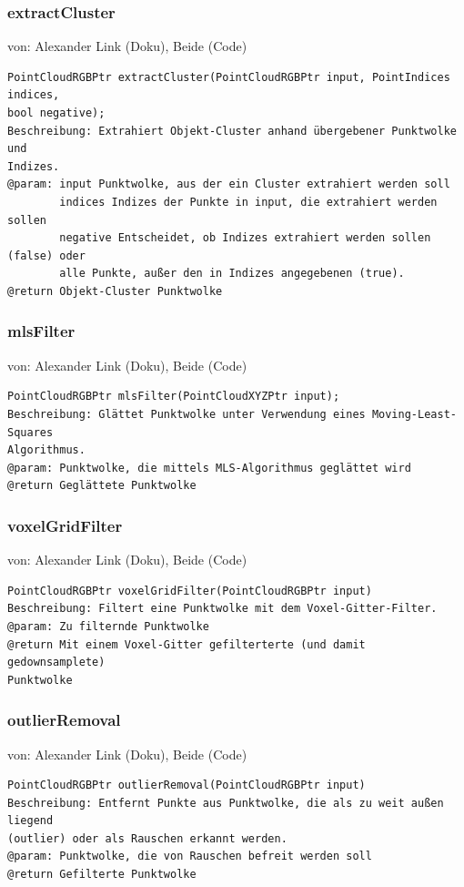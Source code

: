 \documentclass{suturo}
\makeatletter
\newcommand{\chapterauthor}[1]{%
  {\parindent0pt\vspace*{-27pt}%
  \linespread{0}\small\begin{flushright}von: #1\end{flushright}%
  \par\nobreak\vspace*{0pt}}
  \@afterheading%
}
\makeatother
\begin{document}
\subsubsection{extractCluster}
\chapterauthor{Alexander Link (Doku), Beide (Code)}
\begin{verbatim}
PointCloudRGBPtr extractCluster(PointCloudRGBPtr input, PointIndices indices, 
bool negative);
Beschreibung: Extrahiert Objekt-Cluster anhand übergebener Punktwolke und
Indizes.
@param: input Punktwolke, aus der ein Cluster extrahiert werden soll
		indices Indizes der Punkte in input, die extrahiert werden sollen
		negative Entscheidet, ob Indizes extrahiert werden sollen (false) oder
		alle Punkte, außer den in Indizes angegebenen (true).
@return Objekt-Cluster Punktwolke
\end{verbatim}\label{func:extractcluster}

\subsubsection{mlsFilter}
\chapterauthor{Alexander Link (Doku), Beide (Code)}
\begin{verbatim}
PointCloudRGBPtr mlsFilter(PointCloudXYZPtr input);
Beschreibung: Glättet Punktwolke unter Verwendung eines Moving-Least-Squares
Algorithmus.
@param: Punktwolke, die mittels MLS-Algorithmus geglättet wird
@return Geglättete Punktwolke
\end{verbatim}\label{func:mlsfilter}

\subsubsection{voxelGridFilter}
\chapterauthor{Alexander Link (Doku), Beide (Code)}
\begin{verbatim}
PointCloudRGBPtr voxelGridFilter(PointCloudRGBPtr input)
Beschreibung: Filtert eine Punktwolke mit dem Voxel-Gitter-Filter.
@param: Zu filternde Punktwolke
@return Mit einem Voxel-Gitter gefilterterte (und damit gedownsamplete)
Punktwolke
\end{verbatim}\label{func:voxelgridfilter}

\subsubsection{outlierRemoval}
\chapterauthor{Alexander Link (Doku), Beide (Code)}
\begin{verbatim}
PointCloudRGBPtr outlierRemoval(PointCloudRGBPtr input)
Beschreibung: Entfernt Punkte aus Punktwolke, die als zu weit außen liegend
(outlier) oder als Rauschen erkannt werden.
@param: Punktwolke, die von Rauschen befreit werden soll
@return Gefilterte Punktwolke
\end{verbatim}\label{func:outlierremoval}
\end{document}
